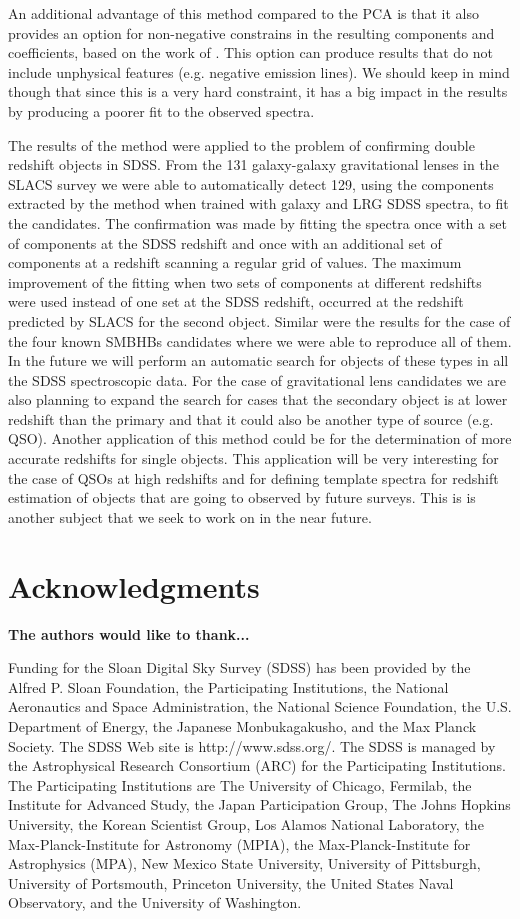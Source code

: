 \documentclass[12pt,preprint]{aastex}
\begin{document}
An additional advantage of this method compared to the PCA is that it also provides an option for non-negative constrains in the resulting components and coefficients, based on the work of \cite{blanton}. This option can produce results that do not include unphysical features (e.g. negative emission lines). We should keep in mind though that since this is a very hard constraint, it has a big impact in the results by producing a poorer fit to the observed spectra.

The results of the method were applied to the problem of confirming
double redshift objects in SDSS. From the 131 galaxy-galaxy
gravitational lenses in the SLACS survey we were able to automatically
detect 129, using the components extracted by the method when trained
with galaxy and LRG SDSS spectra, to fit the candidates. The
confirmation was made by fitting the spectra once with a set of
components at the SDSS redshift and once with an additional set of
components at a redshift scanning a regular grid of values. The
maximum improvement of the fitting when two sets of components at
different redshifts were used instead of one set at the SDSS redshift,
occurred at the redshift predicted by SLACS for the second
object. Similar were the results for the case of the four known SMBHBs
candidates where we were able to reproduce all of them. In the future
we will perform an automatic search for objects of these types in all
the SDSS spectroscopic data. For the case of gravitational lens
candidates we are also planning to expand the search for cases that
the secondary object is at lower redshift than the primary and that it
could also be another type of source (e.g. QSO). Another application
of this method could be for the determination of more accurate
redshifts for single objects. This application will be very
interesting for the case of QSOs at high redshifts and for defining
template spectra for redshift estimation of objects that are going to
observed by future surveys. This is is another subject that we seek to
work on in the near future.

\section{Acknowledgments}
\textbf{The authors would like to thank...}

Funding for the Sloan Digital Sky Survey (SDSS) has been provided by
the Alfred P. Sloan Foundation, the Participating Institutions, the
National Aeronautics and Space Administration, the National Science
Foundation, the U.S. Department of Energy, the Japanese
Monbukagakusho, and the Max Planck Society. The SDSS Web site is
http://www.sdss.org/. The SDSS is managed by the Astrophysical
Research Consortium (ARC) for the Participating Institutions. The
Participating Institutions are The University of Chicago, Fermilab,
the Institute for Advanced Study, the Japan Participation Group, The
Johns Hopkins University, the Korean Scientist Group, Los Alamos
National Laboratory, the Max-Planck-Institute for Astronomy (MPIA),
the Max-Planck-Institute for Astrophysics (MPA), New Mexico State
University, University of Pittsburgh, University of Portsmouth,
Princeton University, the United States Naval Observatory, and the
University of Washington.
\end{document}

